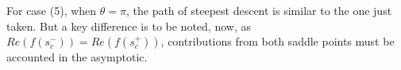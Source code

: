 For case (5), when $\theta = \pi$, the path of steepest descent is similar to the one just taken. But a key difference is to be noted, now, as $Re(f(s_c^-)) = Re(f(s_c^+))$, contributions from both saddle points must be accounted in the asymptotic.


